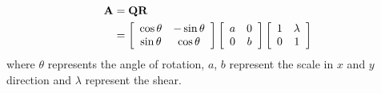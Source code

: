 \begin{exercise}
  \begin{exerciseSection}
    \begin{align}
      \mathbf{A} & = \mathbf{QR} \notag \\
      & = \left[
        \begin{array}{cc}
          \cos\theta & -\sin\theta \\
          \sin\theta & \cos\theta
        \end{array}
      \right]
      \left[
        \begin{array}{cc}
          a & 0 \\
          0 & b
        \end{array}
      \right]
      \left[
        \begin{array}{cc}
          1 & \lambda \\
          0 & 1
        \end{array}
      \right]
    \end{align}
    where $\theta$ represents the angle of rotation, $a$, $b$ represent the scale
    in $x$ and $y$ direction and $\lambda$ represent the shear.
  \end{exerciseSection}
  

\end{exercise}
